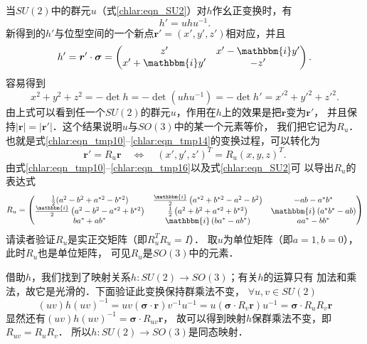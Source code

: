 当$SU(2)$中的群元$u$（式\eqref{chlar:eqn_SU2}）对$h$作幺正变换时，有
\begin{equation}\label{chlar:eqn_tmp10}
    h'= u h u^{-1} .
\end{equation}
新得到的$h'$与位型空间的一个新点$\boldsymbol{r}'=(x',y',z')$相对应，并且
\begin{equation}\label{chlar:eqn_tmp12}
    h'=\boldsymbol{r}'\cdot \boldsymbol{\sigma}
    =\begin{pmatrix}
        z' & x'- \mathbbm{i} y' \\ x'+ \mathbbm{i} y' & -z'
    \end{pmatrix} .
\end{equation}
容易得到
\begin{equation}\label{chlar:eqn_tmp14}
    x^2+y^2+z^2 = -\det h = -\det(u h u^{-1}) = -\det h' = x'^2+y'^2+z'^2 .
\end{equation}
由上式可以看到任一个$SU(2)$的群元$u$，作用在$h$上的效果是把$\boldsymbol{r}$变为$\boldsymbol{r}'$，
并且保持$|\boldsymbol{r}|=|\boldsymbol{r}'|$．这个结果说明$u$与$SO(3)$中的某一个元素等价，
我们把它记为$R_u$．也就是式\eqref{chlar:eqn_tmp10}--\eqref{chlar:eqn_tmp14}的变换过程，可以转化为
\begin{equation}\label{chlar:eqn_tmp16}
    \boldsymbol{r}'= R_u \boldsymbol{r} \quad \Leftrightarrow \quad
    (x', y', z')^T = R_u (x,y,z)^T .
\end{equation}
由式\eqref{chlar:eqn_tmp10}--\eqref{chlar:eqn_tmp16}以及式\eqref{chlar:eqn_SU2}可
以导出$R_u$的表达式
\setlength{\mathindent}{0em}
\begin{equation}\label{chlar:eqn_Ru}
    R_u=\begin{pmatrix}
    \frac{1}{2}(a^2-b^2+a^{*2}-b^{*2}) & 
    \frac{\mathbbm{i}}{2} \left(a^{*2}+b^{*2}-a^2-b^2\right) &     -a b-a^* b^* \\
    \frac{\mathbbm{i}}{2} \left(a^2-b^2-a^{*2}+b^{*2}\right) &
    \frac{1}{2} \left(a^2+b^2+a^{*2}+b^{*2}\right) & 
    \mathbbm{i} \left(a^* b^* -a b\right) \\
    b a^*+a b^* & \mathbbm{i} \left(b a^*-a b^*\right) &    a a^*-b b^* 
\end{pmatrix} 
\end{equation}\setlength{\mathindent}{2em}
请读者验证$R_u$是实正交矩阵（即$R_u^T R_u=I$）．
取$u$为单位矩阵（即$a=1,b=0$），此时$R_u$也是单位矩阵，
可见$R_u$是$SO(3)$中的元素．

借助$h$，我们找到了映射关系$h:SU(2)\to SO(3)$；有关$h$的运算只有
加法和乘法，故它是光滑的．下面验证此变换保持群乘法不变，
$\forall u,v \in SU(2)$
\begin{equation}
    (uv) h (uv)^{-1}= u v (\boldsymbol{\sigma}\cdot \boldsymbol{r})v^{-1} u ^{-1}
    = u (\boldsymbol{\sigma}\cdot R_v \boldsymbol{r}) u ^{-1}
    = \boldsymbol{\sigma}\cdot R_u R_v \boldsymbol{r}
\end{equation}
显然还有$(uv) h (uv)^{-1} = \boldsymbol{\sigma}\cdot R_{uv}\boldsymbol{r}$，
故可以得到映射$h$保群乘法不变，即$R_{uv}=R_{u}R_{v}$．
所以$h:SU(2)\to SO(3)$是同态映射．

